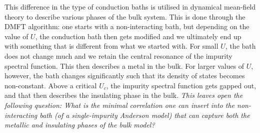 \documentclass[reprint,hidelinks,onecolumn]{revtex4-2}
\begin{document}
This difference in the type of conduction baths is utilised in dynamical mean-field theory to describe various phases of the bulk system.
This is done through the DMFT algorithm: one starts with a non-interacting bath, but depending on the value of \(U\), the conduction bath then gets modified and we ultimately end up with something that is different from what we started with.
For small \(U\), the bath does not change much and we retain the central resonance of the impurity spectral function.
This then describes a metal in the bulk.
For larger values of \(U\), however, the bath changes significantly such that its density of states becomes non-constant.
Above a critical \(U_c\), the impurity spectral function gets gapped out, and that then describes the insulating phase in the bulk.
\textit{This leaves open the following question: What is the minimal correlation one can insert into the non-interacting bath (of a single-impurity Anderson model) that can capture both the metallic and insulating phases of the bulk model?}
\end{document}
